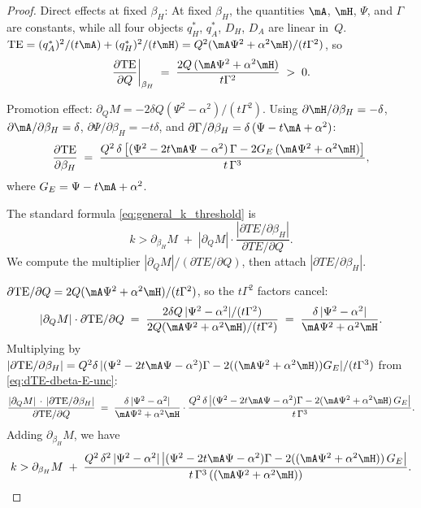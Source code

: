 \begin{proof}
Direct effects at fixed $\beta_H$:
At fixed $\beta_H$, the quantities $\mA$, $\mH$, $\Psi$, and $\Gamma$ are constants, while all four objects $q_H^*$, $q_A^*$, $D_H$, $D_A$ are linear in~$Q$.  $\text{TE} = (q_A^*)^2/(t\mA) + (q_H^*)^2/(t\mH) = Q^2 (\mA\Psi^2 + \alpha^2\mH)/(t\Gamma^2)$, so
\[
\frac{\partial \text{TE}}{\partial Q}\bigg|_{\beta_H}
\;=\; \frac{2Q\,(\mA\Psi^2 + \alpha^2\mH)}{t\Gamma^2} \;>\; 0.
\]


Promotion effect:
$\partial_Q M= -2\delta Q(\Psi^2 - \alpha^2)/(t\Gamma^2)$. Using $\partial\mH/\partial\beta_H = -\delta$, $\partial\mA/\partial\beta_H = \delta$, $\partial\Psi/\partial\beta_H = -t\delta$, and $\partial\Gamma/\partial\beta_H = \delta\,(\Psi - t\mA + \alpha^2)$:
\begin{equation}\label{eq:dTE-dbeta-E-unc}
\frac{\partial\text{TE}}{\partial\beta_H}
\;=\; \frac{Q^2\,\delta\,\bigl[(\Psi^2 - 2t\mA\Psi - \alpha^2)\,\Gamma - 2 G_E\, (\mA\Psi^2+\alpha^2\mH)\bigr]}{t\,\Gamma^3},
\end{equation}
where $G_E = \Psi - t\mA + \alpha^2$.


The standard formula \eqref{eq:general_k_threshold} is
\[
k>\partial_{\beta_H}M
\;+\; \left|\partial_Q M\right|\cdot
\frac{|\partial TE/\partial\beta_H|}{\partial TE/\partial Q}.
\]
We compute the multiplier $|\partial_Q M|/(\partial TE/\partial Q)$, then attach $|\partial TE/\partial\beta_H|$.



$\partial\text{TE}/\partial Q = 2 Q (\mA\Psi^2+\alpha^2\mH)/(t\Gamma^2)$, so the $t\Gamma^2$ factors cancel:
\[
|\partial_Q M|\cdot {\partial\text{TE}/\partial Q}
\;=\; \frac{2\delta Q\,|\Psi^2 - \alpha^2|/(t\Gamma^2)}{2 Q (\mA\Psi^2+\alpha^2\mH)/(t\Gamma^2)}
\;=\; \frac{\delta\,|\Psi^2 - \alpha^2|}{\mA\Psi^2+\alpha^2\mH}.
\]
Multiplying by $|\partial\text{TE}/\partial\beta_H| = Q^2\delta\,|(\Psi^2 - 2t\mA\Psi - \alpha^2)\Gamma - 2 ((\mA\Psi^2+\alpha^2\mH)) G_E|/(t\Gamma^3)$ from \eqref{eq:dTE-dbeta-E-unc}:
\[
\frac{|\partial_Q M|\,\cdot\,|\partial\text{TE}/\partial\beta_H|}{\partial\text{TE}/\partial Q}
\;=\; \frac{\delta\,|\Psi^2 - \alpha^2|}{\mA\Psi^2+\alpha^2\mH}
\cdot \frac{Q^{2}\,\delta\,\bigl|(\Psi^{2}-2t\mA\Psi-\alpha^{2})\Gamma - 2 (\mA\Psi^2+\alpha^2\mH)\, G_E\bigr|}{t\,\Gamma^{3}}.
\]
Adding $\partial_{\beta_H}M$, we have
\begin{equation}k> \partial_{\beta_H}M
\;+\; \frac{Q^{2}\,\delta^{2}\,|\Psi^{2}-\alpha^{2}|\,\bigl|(\Psi^{2}-2t\mA\Psi-\alpha^{2})\Gamma - 2 ((\mA\Psi^2+\alpha^2\mH))\, G_E\bigr|}{t\,\Gamma^{3}\,((\mA\Psi^2+\alpha^2\mH))}.
\end{equation}


\end{proof}
